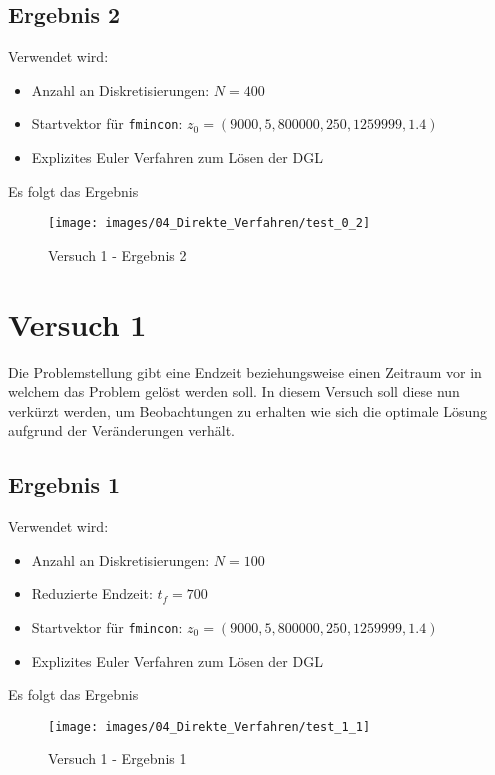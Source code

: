 \subsection{Ergebnis 2}\label{kap:Versuch0Ergebnis2}
Verwendet wird:
\begin{itemize}
\item Anzahl an Diskretisierungen: $N = 400$ 
\item Startvektor für \texttt{fmincon}: $z_0 = (9000,5,800000,250,1259999,1.4)$
\item Explizites Euler Verfahren zum Lösen der DGL
\end{itemize}
Es folgt das Ergebnis
\begin{figure}[H]
\begin{center}
\texttt{[image: images/04\_Direkte\_Verfahren/test\_0\_2]}
\caption{Versuch 1 - Ergebnis 2}\label{img:test_0_2}
\end{center}
\end{figure}














\newpage
\section{Versuch 1}\label{kap:Versuch1}
Die Problemstellung gibt eine Endzeit beziehungsweise einen Zeitraum vor in welchem das Problem gelöst werden soll. In diesem Versuch soll diese nun verkürzt werden, um Beobachtungen zu erhalten wie sich die optimale Lösung aufgrund der Veränderungen verhält. %

\subsection{Ergebnis 1}
Verwendet wird:
\begin{itemize}
\item Anzahl an Diskretisierungen: $N = 100$ 
\item Reduzierte Endzeit: $t_f = 700$
\item Startvektor für \texttt{fmincon}: $z_0 = (9000,5,800000,250,1259999,1.4)$
\item Explizites Euler Verfahren zum Lösen der DGL
\end{itemize}
Es folgt das Ergebnis
\begin{figure}[H]
\begin{center}
\texttt{[image: images/04\_Direkte\_Verfahren/test\_1\_1]}
\caption{Versuch 1 - Ergebnis 1}\label{img:test_1_1}
\end{center}
\end{figure}

